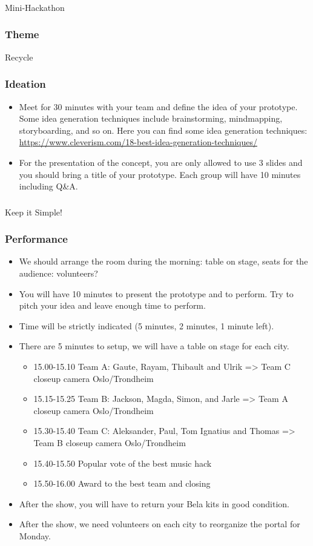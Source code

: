 \documentclass[screen, aspectratio=169]{beamer}
\begin{document}
%
\usebackgroundtemplate{}
\begin{frame}
\frametitle{}
{\huge Mini-Hackathon}
\end{frame}
%
\begin{frame}
\frametitle{Theme}
{\Huge Recycle}
\end{frame}
%
\begin{frame}
  \frametitle{Ideation}
    \begin{itemize}
    	\item Meet for 30 minutes with your team and define the idea of your prototype. Some idea generation techniques include brainstorming, mindmapping, storyboarding, and so on. Here you can find some idea generation techniques: \url{https://www.cleverism.com/18-best-idea-generation-techniques/}
	\item For the presentation of the concept, you are only allowed to use 3 slides and you should bring a title of your prototype. Each group will have 10 minutes including Q\&A.
    \end{itemize}
\end{frame}
%
\begin{frame}
\frametitle{}
{\Huge Keep it Simple!}
\end{frame}
%
\begin{frame}
\frametitle{Performance}
\begin{itemize}
\item We should arrange the room during the morning: table on stage, seats for the audience: volunteers?
\item You will have 10 minutes to present the prototype and to perform. Try to pitch your idea and leave enough time to perform.  
\item Time will be strictly indicated (5 minutes, 2 minutes, 1 minute left). 
\item There are 5 minutes to setup, we will have a table on stage for each city.
	\begin{itemize}
	\item 15.00-15.10 Team A: Gaute, Rayam, Thibault and Ulrik {\scriptsize => Team C closeup camera Oslo/Trondheim}
	\item 15.15-15.25 Team B: Jackson, Magda, Simon, and Jarle  => {\scriptsize Team A closeup camera Oslo/Trondheim}
	\item 15.30-15.40 Team C: Aleksander, Paul, Tom Ignatius and Thomas => {\scriptsize Team B closeup camera Oslo/Trondheim}
	\item 15.40-15.50 Popular vote of the best music hack
	\item 15.50-16.00 Award to the best team and closing
	\end{itemize}
\item After the show, you will have to return your Bela kits in good condition.
\item After the show, we need volunteers on each city to reorganize the portal for Monday.
\end{itemize}	
\end{frame}
\end{document}
